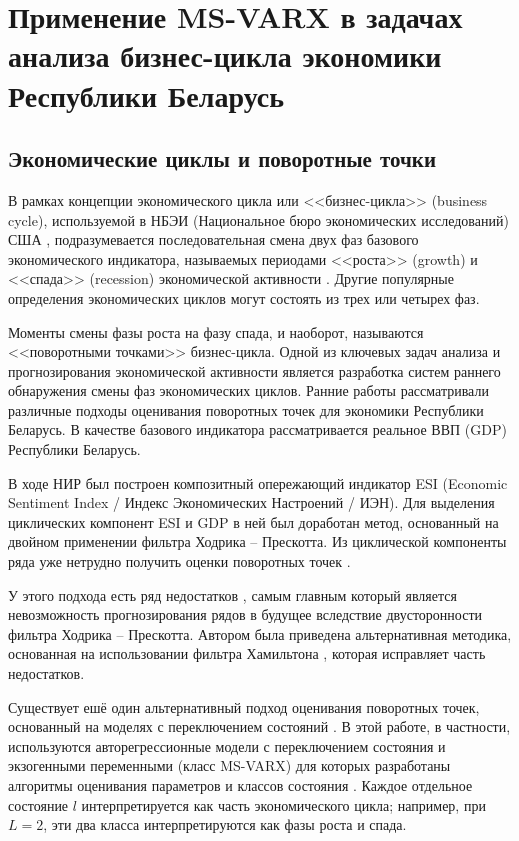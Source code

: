 \documentclass[a4paper,14pt]{extreport}
\begin{document}
\chapter{Применение MS-VARX в задачах анализа бизнес-цикла экономики Республики Беларусь}

\label{chapter:msvarx_for_cycles}


\section{Экономические циклы и поворотные точки}

В рамках концепции экономического цикла или <<бизнес-цикла>> (business cycle), используемой в НБЭИ (Национальное бюро экономических исследований) США \cite{nberDevelopment}, подразумевается последовательная смена двух фаз базового экономического индикатора, называемых периодами <<роста>> (growth) и <<спада>> (recession) экономической активности \cite{oecdCycleExtraction}. Другие популярные определения экономических циклов могут состоять из трех или четырех фаз.

Моменты смены фазы роста на фазу спада, и наоборот, называются <<поворотными точками>> бизнес-цикла. Одной из ключевых задач анализа и прогнозирования экономической активности является разработка систем раннего обнаружения смены фаз экономических циклов.  Ранние работы \cite{esiMaking,esiExtra,mak_mal_bv_2018} рассматривали различные подходы оценивания поворотных точек для экономики Республики Беларусь. В качестве базового индикатора рассматривается реальное ВВП (GDP) Республики Беларусь.

В ходе НИР \cite{esiMaking} был построен композитный опережающий индикатор ESI (Economic Sentiment Index / Индекс Экономических Настроений / ИЭН). Для выделения циклических компонент ESI и GDP в ней был доработан метод, основанный на двойном применении фильтра Ходрика -- Прескотта. Из циклической компоненты ряда уже нетрудно получить оценки поворотных точек \cite{esiMaking,esiExtra}. 

У этого подхода есть ряд недостатков \cite{ham_never_hp}, самым главным который является невозможность прогнозирования рядов в будущее вследствие двусторонности фильтра Ходрика -- Прескотта. Автором была приведена альтернативная методика, основанная на использовании фильтра Хамильтона \cite{mak_mal_bv_2018}, которая исправляет часть недостатков.

Существует ешё один альтернативный подход оценивания поворотных точек, основанный на моделях с переключением состояний \cite{hamNewApproach}. В этой работе, в частности, используются авторегрессионные модели с переключением состояния и экзогенными переменными (класс MS-VARX) для которых разработаны алгоритмы оценивания параметров и классов состояния \cite{malNovopMSVARX,rs_persio2014,goutte_hal_00747479}. Каждое отдельное состояние $l$ интерпретируется как часть экономического цикла; например, при $L=2$, эти два класса интерпретируются как фазы роста и спада. 
\end{document}
